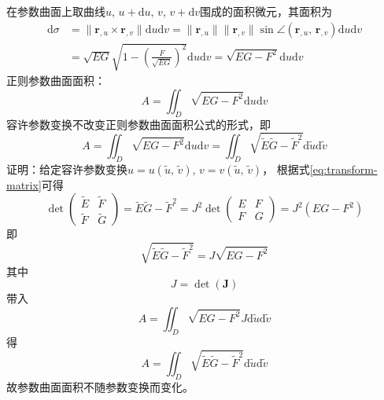 在参数曲面上取曲线$u$, $u+\mathrm{d}u$, $v$, $v+\mathrm{d}v$围成的面积微元，其面积为
\begin{equation}
    \begin{aligned}
    \mathrm{d}\sigma &= \| \mathbf{r}_{,u}\times\mathbf{r}_{,v} \|\mathrm{d}u\mathrm{d}v
    = \|\mathbf{r}_{,u}\|\|\mathbf{r}_{,v}\|\sin\angle\left(\mathbf{r}_{,u},\,\mathbf{r}_{,v}\right)\mathrm{d}u\mathrm{d}v \\
    &= \sqrt{EG}\sqrt{1-\left(\frac{F}{\sqrt{EG}}\right)^{2}}\mathrm{d}u\mathrm{d}v = \sqrt{EG-F^{2}}\mathrm{d}u\mathrm{d}v
    \end{aligned}
\end{equation}
正则参数曲面面积：
\begin{equation}
    A=\iint_{D}\sqrt{EG-F^{2}}\mathrm{d}u\mathrm{d}v
\end{equation}
容许参数变换不改变正则参数曲面面积公式的形式，即
\begin{equation}
    A=\iint_{D}\sqrt{EG-F^{2}}\mathrm{d}u\mathrm{d}v = \iint_{D}\sqrt{\tilde{E}\tilde{G}-\tilde{F}^{2}}\mathrm{d}\tilde{u}\mathrm{d}\tilde{v}
\end{equation}
证明：给定容许参数变换$u=u(\tilde{u},\, \tilde{v})$, $v=v(\tilde{u},\, \tilde{v})$，
根据式\eqref{eq:transform-matrix}可得
\begin{equation*}
    \det\left(\begin{array}{cc} \tilde{E} & \tilde{F} \\ \tilde{F} & \tilde{G} \end{array}\right) = 
    \tilde{E}\tilde{G}-\tilde{F}^{2} =
    J^{2}\det\left(\begin{array}{cc} E & F \\ F & G \end{array}\right) = 
    J^{2}\left(EG-F^{2}\right)
\end{equation*}
即
\begin{equation*}
    \sqrt{\tilde{E}\tilde{G}-\tilde{F}^{2}} = J\sqrt{EG-F^{2}}
\end{equation*}
其中
\begin{equation*}
    J = \det\left(\mathbf{J}\right)
\end{equation*}
带入
\begin{equation*}
    A = \iint_{D}\sqrt{EG-F^{2}}J\mathrm{d}\tilde{u}\mathrm{d}\tilde{v}
\end{equation*}
得
\begin{equation*}
    A = \iint_{D}\sqrt{\tilde{E}\tilde{G}-\tilde{F}^{2}}\mathrm{d}\tilde{u}\mathrm{d}\tilde{v}
\end{equation*}
故参数曲面面积不随参数变换而变化。



